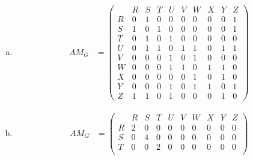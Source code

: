 \documentclass[10pt,letterpaper, cm]{hmcpset}
\begin{document}
\begin{enumerate}[(a)]

    \item 
    
    \begin{align*}

      AM_G &= \begin{pmatrix}


             & R & S & T & U & V & W & X & Y & Z \\        

         R   & 0 & 1 & 0 & 0 & 0 & 0 & 0 & 0 & 1 \\

         S   & 1 & 0 & 1 & 0 & 0 & 0 & 0 & 0 & 1 \\

         T   & 0 & 1 & 0 & 1 & 0 & 0 & 0 & 0 & 0 \\

         U   & 0 & 1 & 1 & 0 & 1 & 1 & 0 & 1 & 1  \\

         V   & 0 & 0 & 0 & 1 & 0 & 1 & 0 & 0 & 0 \\

         W   & 0 & 0 & 0 & 1 & 1 & 0 & 1 & 1 & 0 \\

         X   & 0 & 0 & 0 & 0 & 0 & 1 & 0 & 1 & 0 \\

         Y   & 0 & 0 & 0 & 1 & 0 & 1 & 1 & 0 & 1 \\

         Z   & 1 & 1 & 0 & 1 & 0 & 0 & 0 & 1 & 0

      \end{pmatrix}  
              \end{align*}
    \item 
    
    \begin{align*}

      AM_G &= \begin{pmatrix}


             & R & S & T & U & V & W & X & Y & Z \\        

         R   & 2 & 0 & 0 & 0 & 0 & 0 & 0 & 0 & 0 \\

         S   & 0 & 4 & 0 & 0 & 0 & 0 & 0 & 0 & 0 \\

         T   & 0 & 0 & 2 & 0 & 0 & 0 & 0 & 0 & 0 \\


\end{pmatrix}
\end{align*}
\end{enumerate}
\end{document}
